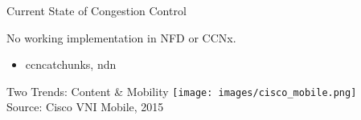 \begin{frame}{Current State of Congestion Control}

No working implementation in NFD or CCNx.
\begin{itemize}
	\item ccncatchunks, ndn
\end{itemize}

\end{frame}

\begin{frame}{Two Trends: Content \& Mobility}
	\texttt{[image: images/cisco\_mobile.png]}\\
	\scriptsize
	Source: Cisco VNI Mobile, 2015
\end{frame}

%

